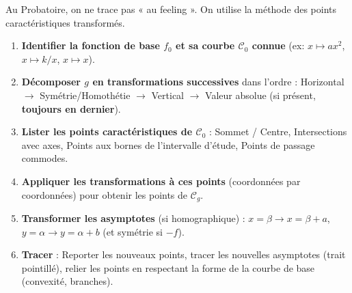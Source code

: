 \documentclass[11pt]{article}
\begin{document}
Au Probatoire, on ne trace pas « au feeling ». On utilise la méthode des points caractéristiques transformés.

\begin{methode}[Tracer $\mathcal{C}_g$ pour $g(x) = f(x-a)+b$ ou $g(x) = |f(x-a)+b|$ etc.]
\begin{enumerate}
    \item \textbf{Identifier la fonction de base $f_0$ et sa courbe $\mathcal{C}_0$ connue} (ex: $x \mapsto ax^2$, $x \mapsto k/x$, $x \mapsto x$).
    \item \textbf{Décomposer $g$ en transformations successives} dans l'ordre : Horizontal $\to$ Symétrie/Homothétie $\to$ Vertical $\to$ Valeur absolue (si présent, \textbf{toujours en dernier}).
    \item \textbf{Lister les points caractéristiques de $\mathcal{C}_0$} : Sommet / Centre, Intersections avec axes, Points aux bornes de l'intervalle d'étude, Points de passage commodes.
    \item \textbf{Appliquer les transformations à ces points} (coordonnées par coordonnées) pour obtenir les points de $\mathcal{C}_g$.
    \item \textbf{Transformer les asymptotes} (si homographique) : $x=\beta \to x=\beta+a$, $y=\alpha \to y=\alpha+b$ (et symétrie si $-f$).
    \item \textbf{Tracer} : Reporter les nouveaux points, tracer les nouvelles asymptotes (trait pointillé), relier les points en respectant la forme de la courbe de base (convexité, branches).
\end{enumerate}
\end{methode}
\end{document}
